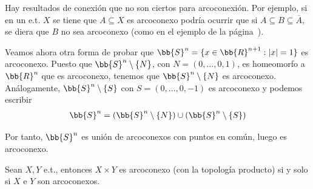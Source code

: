 \begin{observacion}
    Hay resultados de conexión que no son ciertos para arcoconexión. Por ejemplo, si en un e.t. $X$ se tiene que $A\subseteq X$ es arcoconexo podría ocurrir que si $A\subseteq B \subseteq \overline{A}$, se diera que $B$ no sea arcoconexo (como en el ejemplo de la página~\pageref{ej:conexo_no_arcoconexo}).
\end{observacion}

\begin{ejemplo}
    Veamos ahora otra forma de probar que $\bb{S}^n = \{x\in \bb{R}^{n+1} : |x| = 1\}$ es arcoconexo. Puesto que $\bb{S}^n\setminus \{N\}$, con $N=(0,\dots,0,1)$, es homeomorfo a $\bb{R}^n$ que es arcoconexo, tenemos que $\bb{S}^n \setminus\{N\}$ es arcoconexo. Análogamente, $\bb{S}^n \setminus\{S\}$ con $S=(0,\dots,0,-1)$ es arcoconexo y podemos escribir
    \begin{gather*}
        \bb{S}^n = (\bb{S}^n \setminus\{N\}) \cup (\bb{S}^n \setminus\{S\})
    \end{gather*}
    
    Por tanto, $\bb{S}^n$ es unión de arcoconexos con puntos en común, luego es arcoconexo.
\end{ejemplo}

\begin{teo}
    Sean $X,Y$ e.t., entonces $X\times Y$ es arcoconexo (con la topología producto) si y solo si $X$ e $Y$ son arcoconexos.
\end{teo}

